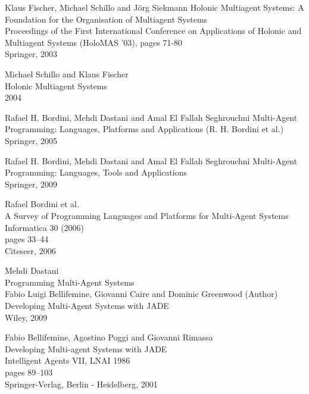 \begin{thebibliography}{99}
Klaus Fischer, Michael Schillo and J\"{o}rg Siekmann
Holonic Multiagent Systems: A Foundation for the Organisation of Multiagent Systems\\
Proceedings of the First International Conference on Applications of Holonic and Multiagent Systems (HoloMAS '03), pages 71-80\\
Springer, 2003

Michael Schillo and Klaus Fischer\\
Holonic Multiagent Systems\\
2004


Rafael H. Bordini, Mehdi Dastani and Amal El Fallah Seghrouchni
Multi-Agent Programming: Languages, Platforms and Applications (R. H. Bordini et al.)\\
Springer, 2005

Rafael H. Bordini, Mehdi Dastani and Amal El Fallah Seghrouchni
Multi-Agent Programming: Languages, Tools and Applications\\
Springer, 2009

Rafael Bordini et al.\\
A Survey of Programming Languages and Platforms for Multi-Agent Systems\\
Informatica 30 (2006)\\
pages 33–44\\
Citeseer, 2006

Mehdi Dastani\\
Programming Multi-Agent Systems\\


Fabio Luigi Bellifemine, Giovanni Caire and Dominic Greenwood (Author)
Developing Multi-Agent Systems with JADE\\
Wiley, 2009

Fabio Bellifemine, Agostino Poggi and Giovanni Rimassa\\
Developing Multi-agent Systems with JADE\\
Intelligent Agents VII, LNAI 1986\\
pages 89–103\\
Springer-Verlag, Berlin - Heidelberg, 2001


\end{thebibliography}
